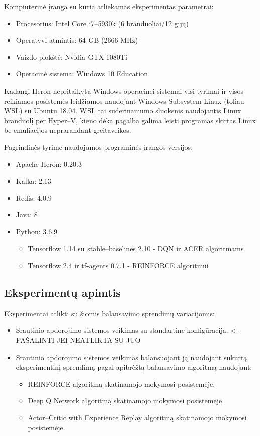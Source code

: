 \documentclass{VUMIFPSbakalaurinis}
\begin{document}
Kompiuterinė įranga su kuria atliekamas eksperimentas parametrai:
\begin{itemize}
    \item Procesorius: Intel Core i7–5930k (6 branduoliai/12 gijų)
    \item Operatyvi atmintis: 64 GB (2666 MHz)
    \item Vaizdo plokštė: Nvidia GTX 1080Ti
    \item Operacinė sistema: Windows 10 Education
\end{itemize}

Kadangi Heron nepritaikyta Windows operacinei sistemai visi tyrimai ir visos reikiamos posistemės leidžiamos naudojant Windows Subsystem Linux (toliau WSL) su Ubuntu 18.04. WSL tai suderinamumo sluoksnis naudojantis Linux branduolį per Hyper–V, kieno dėka pagalba galima leisti programas skirtas Linux be emuliacijos neprarandant greitaveikos.

Pagrindinės tyrime naudojamos programinės įrangos versijos:
\begin{itemize}
    \item Apache Heron: 0.20.3
    \item Kafka: 2.13
    \item Redis: 4.0.9
    \item Java: 8
    \item Python: 3.6.9
    \begin{itemize}
        \item Tensorflow 1.14 su stable–baselines 2.10 - DQN ir ACER algoritmams
        \item Tensorflow 2.4 ir tf-agents 0.7.1 - REINFORCE algoritmui
    \end{itemize}
\end{itemize}
\subsection{Eksperimentų apimtis}

Eksperimentai atlikti su šiomis balansavimo sprendimų variacijomis:
\begin{itemize}
    \item Srautinio apdorojimo sistemos veikimas su standartine konfigūracija. <- PAŠALINTI JEI NEATLIKTA SU JUO
    \item Srautinio apdorojimo sistemos veikimas balansuojant ją naudojant sukurtą eksperimentinį sprendimą pagal apibrėžtą balansavimo algoritmą naudojant:
    \begin{itemize}
        \item REINFORCE algoritmą skatinamojo mokymosi posistemėje.
        \item Deep Q Network algoritmą skatinamojo mokymosi posistemėje.
        \item Actor–Critic with Experience Replay algoritmą skatinamojo mokymosi posistemėje.
    \end{itemize}
\end{itemize}
\end{document}
